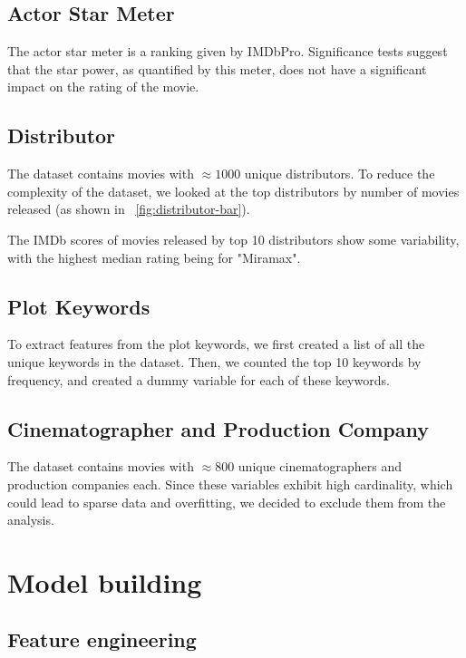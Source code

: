 \documentclass[12pt,a4paper]{article}
\begin{document}
\subsection{Actor Star Meter}\label{subsec:star-meter}
The actor star meter is a ranking given by IMDbPro.
Significance tests suggest that the star power, as quantified by this meter, does not have a significant impact on the rating of the movie.

\subsection{Distributor}\label{subsec:distributor}
The dataset contains movies with $\approx 1000$ unique distributors.
To reduce the complexity of the dataset, we looked at the top distributors by number of movies released (as shown in \figurename~\ref{fig:distributor-bar}).

The IMDb scores of movies released by top 10 distributors show some variability, with the highest median rating being for "Miramax".

\subsection{Plot Keywords}\label{subsec:plot-keywords}
To extract features from the plot keywords, we first created a list of all the unique keywords in the dataset.
Then, we counted the top 10 keywords by frequency, and created a dummy variable for each of these keywords.

\subsection{Cinematographer and Production Company}\label{subsec:cinematographer_production_company}
The dataset contains movies with $\approx 800$ unique cinematographers and production companies each.
Since these variables exhibit high cardinality, which could lead to sparse data and overfitting, we decided to exclude them from the analysis.

\section{Model building}\label{sec:model-building}
\subsection{Feature engineering}\label{subsec:data-preprocessing}
\end{document}
